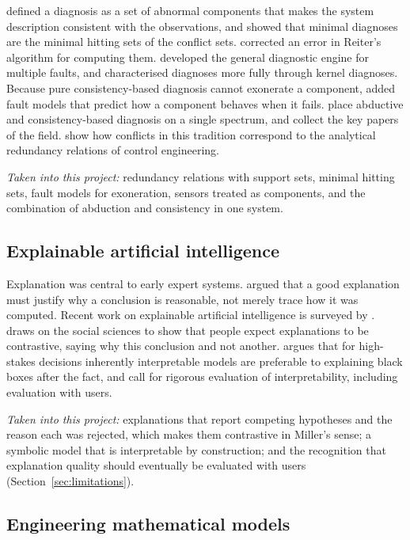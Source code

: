 \textcite{reiter1987} defined a diagnosis as a set of abnormal components that makes the system description consistent with the observations, and showed that minimal diagnoses are the minimal hitting sets of the conflict sets. \textcite{greiner1989} corrected an error in Reiter's algorithm for computing them. \textcite{dekleer1987} developed the general diagnostic engine for multiple faults, and \textcite{dekleer1992} characterised diagnoses more fully through kernel diagnoses. Because pure consistency-based diagnosis cannot exonerate a component, \textcite{struss1989} added fault models that predict how a component behaves when it fails. \textcite{console1991} place abductive and consistency-based diagnosis on a single spectrum, and \textcite{hamscher1992} collect the key papers of the field. \textcite{cordier2004} show how conflicts in this tradition correspond to the analytical redundancy relations of control engineering.

\emph{Taken into this project:} redundancy relations with support sets, minimal hitting sets, fault models for exoneration, sensors treated as components, and the combination of abduction and consistency in one system.

\subsection{Explainable artificial intelligence}

Explanation was central to early expert systems. \textcite{swartout1983} argued that a good explanation must justify why a conclusion is reasonable, not merely trace how it was computed. Recent work on explainable artificial intelligence is surveyed by \textcite{adadi2018}. \textcite{miller2019} draws on the social sciences to show that people expect explanations to be contrastive, saying why this conclusion and not another. \textcite{rudin2019} argues that for high-stakes decisions inherently interpretable models are preferable to explaining black boxes after the fact, and \textcite{doshivelez2017} call for rigorous evaluation of interpretability, including evaluation with users.

\emph{Taken into this project:} explanations that report competing hypotheses and the reason each was rejected, which makes them contrastive in Miller's sense; a symbolic model that is interpretable by construction; and the recognition that explanation quality should eventually be evaluated with users (Section~\ref{sec:limitations}).

\subsection{Engineering mathematical models}

